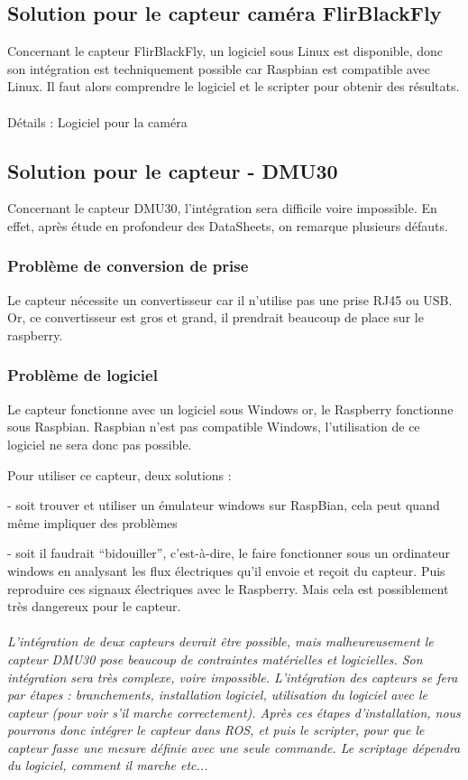 \documentclass{PackagerQualityN}
\begin{document}
\subsection{Solution pour le capteur caméra FlirBlackFly}
Concernant le capteur FlirBlackFly, un logiciel sous Linux est disponible, donc son intégration est techniquement possible car Raspbian est compatible avec Linux.
Il faut alors comprendre le logiciel et le scripter pour obtenir des résultats.
\\
\\
Détails : Logiciel pour la caméra \citep{lienLogicielCamera} 
\newp %
\subsection{Solution pour le capteur - DMU30}
Concernant le capteur DMU30, l’intégration sera difficile voire impossible. En effet, après étude en profondeur des DataSheets, on remarque plusieurs défauts.
\subsubsection{Problème de conversion de prise}
Le capteur nécessite un convertisseur car il n’utilise pas une prise RJ45 ou USB. Or, ce convertisseur est gros et grand, il prendrait beaucoup de place sur le raspberry.
\subsubsection{Problème de logiciel}
Le capteur fonctionne avec un logiciel sous Windows or, le Raspberry fonctionne sous Raspbian. Raspbian n’est pas compatible Windows, l’utilisation de ce logiciel ne sera donc pas possible.

Pour utiliser ce capteur, deux solutions :

- soit trouver et utiliser un émulateur windows sur RaspBian, cela peut quand même impliquer des problèmes

- soit il faudrait “bidouiller”, c’est-à-dire, le faire fonctionner sous un ordinateur windows en analysant les flux électriques qu’il envoie et reçoit du capteur. Puis reproduire ces signaux électriques avec le Raspberry.
Mais cela est possiblement très dangereux pour le capteur.


\paragraph{}
\textit{L'intégration de deux capteurs devrait être possible, mais malheureusement le capteur DMU30 pose beaucoup de contraintes matérielles et logicielles. Son intégration sera très complexe, voire impossible. L'intégration des capteurs se fera par étapes : branchements, installation logiciel, utilisation du logiciel avec le capteur (pour voir s'il marche correctement). Après ces étapes d'installation, nous pourrons donc intégrer le capteur dans ROS, et puis le scripter, pour que le capteur fasse une mesure définie avec une seule commande. Le scriptage dépendra du logiciel, comment il marche etc...}
\end{document}
